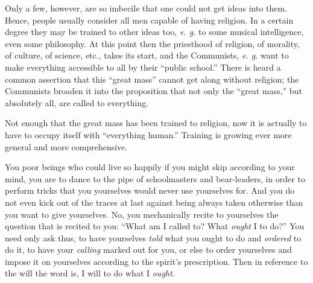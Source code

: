 \documentclass[12pt,a4paper]{book}
\begin{document}
Only a few, however, are so imbecile that one could not get ideas into them. 
Hence, people usually consider all men capable of having religion. In a 
certain degree they may be trained to other ideas too, \textit{e. g.} to some 
musical intelligence, even some philosophy. At this point then the priesthood 
of religion, of morality, of culture, of science, etc., takes its start, and 
the Communists, \textit{e. g.} want to make everything accessible to all by 
their ``public school.'' There is heard a common assertion that this 
``great mass'' cannot get along without religion; the Communists broaden it 
into the proposition that not only the ``great mass,'' but absolutely all, 
are called to everything.

Not enough that the great mass has been trained to religion, now it is 
actually to have to occupy itself with ``everything human.'' Training is 
growing ever more general and more comprehensive.

You poor beings who could live so happily if you might skip according to your 
mind, you are to dance to the pipe of schoolmasters and bear-leaders, in order 
to perform tricks that you yourselves would never use yourselves for. And you 
do not even kick out of the traces at last against being always taken 
otherwise than you want to give yourselves. No, you mechanically recite to 
yourselves the question that is recited to you: ``What am I called to? What 
\textit{ought} I to do?'' You need only ask thus, to have yourselves 
\textit{told} what you ought to do and \textit{ordered} to do it, to have your 
\textit{calling} marked out for you, or else to order yourselves and impose it 
on yourselves according to the spirit's prescription. Then in reference to the 
will the word is, I will to do what I \textit{ought}.
\end{document}
